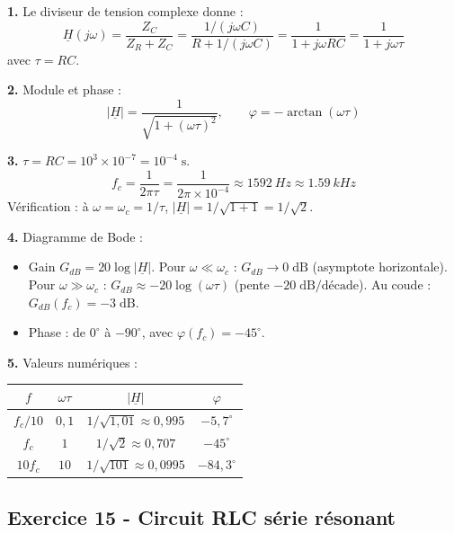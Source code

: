 \documentclass[12pt,a4paper]{article}
\begin{document}
\begin{boitecorrige}
\textbf{1.} Le diviseur de tension complexe donne :
\[
\underline{H}(j\omega) = \frac{Z_C}{Z_R+Z_C} = \frac{1/(j\omega C)}{R+1/(j\omega C)} = \frac{1}{1+j\omega RC} = \frac{1}{1+j\omega\tau}
\]
avec $\tau = RC$.

\textbf{2.} Module et phase :
\[
|\underline{H}| = \frac{1}{\sqrt{1+(\omega\tau)^2}}, \qquad \varphi = -\arctan(\omega\tau)
\]

\textbf{3.} $\tau = RC = 10^3\times10^{-7} = 10^{-4}\;\text{s}$.
\[
f_c = \frac{1}{2\pi\tau} = \frac{1}{2\pi\times10^{-4}} \approx \qty{1592}{Hz} \approx \qty{1.59}{kHz}
\]
Vérification : à $\omega=\omega_c=1/\tau$, $|\underline{H}| = 1/\sqrt{1+1} = 1/\sqrt{2}$.

\textbf{4.} Diagramme de Bode :
\begin{itemize}[nosep]
  \item Gain $G_{dB} = 20\log|\underline{H}|$. Pour $\omega\ll\omega_c$ : $G_{dB}\to 0\;\text{dB}$ (asymptote horizontale). Pour $\omega\gg\omega_c$ : $G_{dB}\approx -20\log(\omega\tau)$ (pente $-20\;\text{dB/décade}$). Au coude : $G_{dB}(f_c) = -3\;\text{dB}$.
  \item Phase : de $0^\circ $ à $-90^\circ $, avec $\varphi(f_c) = -45^\circ $.
\end{itemize}

\textbf{5.} Valeurs numériques :
\begin{center}
\renewcommand{\arraystretch}{1.2}
\begin{tabular}{|c|c|c|c|}
\hline
$f$ & $\omega\tau$ & $|\underline{H}|$ & $\varphi$\\
\hline
$f_c/10$ & $0{,}1$ & $1/\sqrt{1{,}01}\approx 0{,}995$ & $-5{,}7^\circ$\\
$f_c$ & $1$ & $1/\sqrt{2}\approx 0{,}707$ & $-45^\circ$\\
$10f_c$ & $10$ & $1/\sqrt{101}\approx 0{,}0995$ & $-84{,}3^\circ$\\
\hline
\end{tabular}
\end{center}
\end{boitecorrige}

\subsection*{Exercice 15 - Circuit RLC série résonant \niveau{\difficile}}
\end{document}

